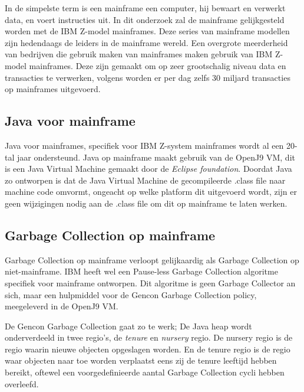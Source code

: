 In de simpelste term is een mainframe een computer, hij bewaart en verwerkt data, en voert instructies uit.
In dit onderzoek zal de mainframe gelijkgesteld worden met de IBM Z-model mainframes.
Deze series van mainframe modellen zijn hedendaags de leiders in de mainframe wereld.
Een overgrote meerderheid van bedrijven die gebruik maken van mainframes maken gebruik van IBM Z-model mainframes.
Deze zijn gemaakt om op zeer grootschalig niveau data en transacties te verwerken, volgens \textcite{Critchley2021} worden er per dag zelfs 30 miljard transacties op mainframes uitgevoerd.



\subsection{Java voor mainframe}
\label{sec:mainframe java}
Java voor mainframes, specifiek voor IBM Z-system mainframes wordt al een 20-tal jaar ondersteund.
Java op mainframe maakt gebruik van de OpenJ9 VM, dit is een Java Virtual Machine gemaakt door de \textit{Eclipse foundation}.
Doordat Java zo ontworpen is dat de Java Virtual Machine de gecompileerde .class file naar machine code omvormt, ongeacht op welke platform dit uitgevoerd wordt, zijn er geen wijzigingen nodig aan de .class file om dit op mainframe te laten werken.


\subsection{Garbage Collection op mainframe}
\label{sec:mainframe garbage collection}
Garbage Collection op mainframe verloopt gelijkaardig als Garbage Collection op niet-mainframe.
IBM heeft wel een Pause-less Garbage Collection algoritme specifiek voor mainframe ontworpen.
Dit algoritme is geen Garbage Collector an sich, maar een hulpmiddel voor de Gencon Garbage Collection policy, meegeleverd in de OpenJ9 VM.


De Gencon Garbage Collection gaat zo te werk;
De Java heap wordt onderverdeeld in twee regio's, de \textit{tenure} en \textit{nursery} regio.
De nursery regio is de regio waarin nieuwe objecten opgeslagen worden.
En de tenure regio is de regio waar objecten naar toe worden verplaatst eens zij de tenure leeftijd hebben bereikt, oftewel een voorgedefinieerde aantal Garbage Collection cycli hebben overleefd. 

